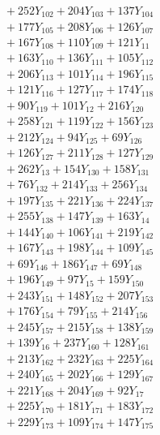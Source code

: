 \documentclass[a4paper,10pt]{article}
\begin{document}
{\begin{align}
&\quad  + 252Y_{102} + 204Y_{103} + 137Y_{104} \\[0.5ex]
&\quad  + 177Y_{105} + 208Y_{106} + 126Y_{107} \\[0.5ex]
&\quad  + 167Y_{108} + 110Y_{109} + 121Y_{11} \\[0.5ex]
&\quad  + 163Y_{110} + 136Y_{111} + 105Y_{112} \\[0.5ex]
&\quad  + 206Y_{113} + 101Y_{114} + 196Y_{115} \\[0.5ex]
&\quad  + 121Y_{116} + 127Y_{117} + 174Y_{118} \\[0.5ex]
&\quad  + 90Y_{119} + 101Y_{12} + 216Y_{120} \\[0.5ex]
&\quad  + 258Y_{121} + 119Y_{122} + 156Y_{123} \\[0.5ex]
&\quad  + 212Y_{124} + 94Y_{125} + 69Y_{126} \\[0.5ex]
&\quad  + 126Y_{127} + 211Y_{128} + 127Y_{129} \\[0.5ex]
&\quad  + 262Y_{13} + 154Y_{130} + 158Y_{131} \\[0.5ex]
&\quad  + 76Y_{132} + 214Y_{133} + 256Y_{134} \\[0.5ex]
&\quad  + 197Y_{135} + 221Y_{136} + 224Y_{137} \\[0.5ex]
&\quad  + 255Y_{138} + 147Y_{139} + 163Y_{14} \\[0.5ex]
&\quad  + 144Y_{140} + 106Y_{141} + 219Y_{142} \\[0.5ex]
&\quad  + 167Y_{143} + 198Y_{144} + 109Y_{145} \\[0.5ex]
&\quad  + 69Y_{146} + 186Y_{147} + 69Y_{148} \\[0.5ex]
&\quad  + 196Y_{149} + 97Y_{15} + 159Y_{150} \\[0.5ex]
&\quad  + 243Y_{151} + 148Y_{152} + 207Y_{153} \\[0.5ex]
&\quad  + 176Y_{154} + 79Y_{155} + 214Y_{156} \\[0.5ex]
&\quad  + 245Y_{157} + 215Y_{158} + 138Y_{159} \\[0.5ex]
&\quad  + 139Y_{16} + 237Y_{160} + 128Y_{161} \\[0.5ex]
&\quad  + 213Y_{162} + 232Y_{163} + 225Y_{164} \\[0.5ex]
&\quad  + 240Y_{165} + 202Y_{166} + 129Y_{167} \\[0.5ex]
&\quad  + 221Y_{168} + 204Y_{169} + 92Y_{17} \\[0.5ex]
&\quad  + 225Y_{170} + 181Y_{171} + 183Y_{172} \\[0.5ex]
&\quad  + 229Y_{173} + 109Y_{174} + 147Y_{175} \\[0.5ex]

\end{align}}
\end{document}
